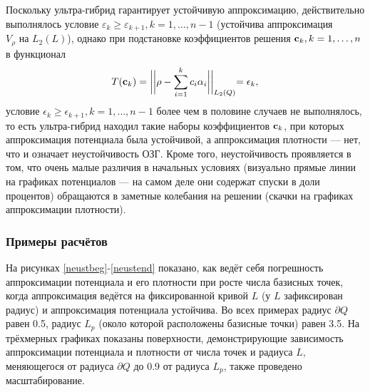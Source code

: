 \documentclass[a4paper]{article}
\begin{document}
Поскольку ультра-гибрид гарантирует устойчивую аппроксимацию, действительно выполнялось условие $\varepsilon_k \geq \varepsilon_{k+1}, k=1, \dots, n-1$ (устойчива аппроксимация $V_{\rho} \text{ на } L_2(L)$), однако при подстановке коэффициентов решения ${\bf c}_k, k=1,\dots,n$ в функционал
\begin{equation*}
  T({\bf c}_k)=\biggl|\biggl|\rho - \sum_{i=1}^k c_i \alpha_i\biggl|\biggl|_{L_2(Q)}=\epsilon_k,
\end{equation*}
условие $\epsilon_k \geq \epsilon_{k+1}, k=1, \dots, n-1$ более чем в половине случаев не выполнялось, то есть ультра-гибрид находил такие наборы коэффициентов ${\bf c}_k$, при которых
аппроксимация потенциала была устойчивой, а аппроксимация плотности --- нет, что и означает неустойчивость ОЗГ.
Кроме того, неустойчивость проявляется в том, что очень малые различия в начальных условиях (визуально прямые линии на графиках потенциалов --- на самом деле они содержат спуски в доли процентов) обращаются в заметные колебания на решении (скачки на графиках аппроксимации плотности).

\subsubsection{Примеры расчётов}
На рисунках \ref{neustbeg}-\ref{neustend} показано, как ведёт себя погрешность аппроксимации потенциала и его плотности при росте числа базисных точек, когда аппроксимация ведётся на фиксированной кривой $L$ (у $L$ зафиксирован радиус) и аппроксимация потенциала устойчива.
Во всех примерах радиус $\partial Q$ равен 0.5, радиус $L_p$ (около которой расположены базисные точки) равен 3.5. На трёхмерных графиках показаны поверхности, демонстрирующие зависимость аппроксимации потенциала и плотности от числа точек и радиуса $L$, меняющегося от радиуса $\partial Q$ до 0.9 от радиуса $L_p$, также проведено масштабирование.
\end{document}
